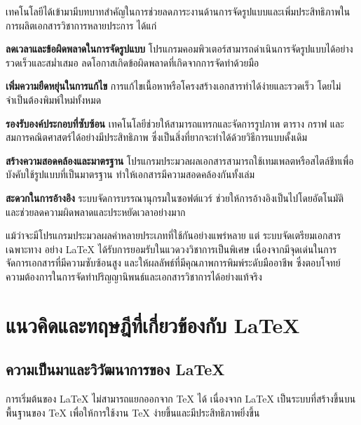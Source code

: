 \hspace*{1.5em} %
เทคโนโลยีได้เข้ามามีบทบาทสำคัญในการช่วยลดภาระงานด้านการจัดรูปแบบและเพิ่มประสิทธิภาพในการผลิตเอกสารวิชาการหลายประการ ได้แก่
\begin{mycustomitem}
    \item \textbf{ลดเวลาและข้อผิดพลาดในการจัดรูปแบบ} โปรแกรมคอมพิวเตอร์สามารถดำเนินการจัดรูปแบบได้อย่างรวดเร็วและสม่ำเสมอ ลดโอกาสเกิดข้อผิดพลาดที่เกิดจากการจัดทำด้วยมือ
    \item \textbf{เพิ่มความยืดหยุ่นในการแก้ไข} การแก้ไขเนื้อหาหรือโครงสร้างเอกสารทำได้ง่ายและรวดเร็ว โดยไม่จำเป็นต้องพิมพ์ใหม่ทั้งหมด
    \item \textbf{รองรับองค์ประกอบที่ซับซ้อน} เทคโนโลยีช่วยให้สามารถแทรกและจัดการรูปภาพ ตาราง กราฟ และสมการคณิตศาสตร์ได้อย่างมีประสิทธิภาพ ซึ่งเป็นสิ่งที่ยากจะทำได้ด้วยวิธีการแบบดั้งเดิม
    \item \textbf{สร้างความสอดคล้องและมาตรฐาน} โปรแกรมประมวลผลเอกสารสามารถใช้เทมเพลตหรือสไตล์ชีทเพื่อบังคับใช้รูปแบบที่เป็นมาตรฐาน ทำให้เอกสารมีความสอดคล้องกันทั้งเล่ม
    \item \textbf{สะดวกในการอ้างอิง} ระบบจัดการบรรณานุกรมในซอฟต์แวร์ ช่วยให้การอ้างอิงเป็นไปโดยอัตโนมัติ และช่วยลดความผิดพลาดและประหยัดเวลาอย่างมาก
\end{mycustomitem}

\hspace*{1.5em} %
แม้ว่าจะมีโปรแกรมประมวลผลคำหลายประเภทที่ใช้กันอย่างแพร่หลาย แต่ ระบบจัดเตรียมเอกสารเฉพาะทาง อย่าง LaTeX ได้รับการยอมรับในแวดวงวิชาการเป็นพิเศษ เนื่องจากมีจุดเด่นในการจัดการเอกสารที่มีความซับซ้อนสูง และให้ผลลัพธ์ที่มีคุณภาพการพิมพ์ระดับมืออาชีพ ซึ่งตอบโจทย์ความต้องการในการจัดทำปริญญานิพนธ์และเอกสารวิชาการได้อย่างแท้จริง



\section{แนวคิดและทฤษฎีที่เกี่ยวข้องกับ LaTeX}
\subsection{ความเป็นมาและวิวัฒนาการของ LaTeX}

\hspace*{1.5em} %
การเริ่มต้นของ LaTeX ไม่สามารถแยกออกจาก TeX ได้ เนื่องจาก LaTeX เป็นระบบที่สร้างขึ้นบนพื้นฐานของ TeX เพื่อให้การใช้งาน TeX ง่ายขึ้นและมีประสิทธิภาพยิ่งขึ้น

